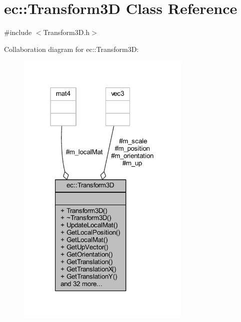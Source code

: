 \hypertarget{classec_1_1_transform3_d}{}\section{ec\+:\+:Transform3D Class Reference}
\label{classec_1_1_transform3_d}


{\ttfamily \#include $<$Transform3\+D.\+h$>$}



Collaboration diagram for ec\+:\+:Transform3D\+:
\nopagebreak
\begin{figure}[H]
\begin{center}
\leavevmode
\includegraphics[width=235pt]{classec_1_1_transform3_d__coll__graph}
\end{center}
\end{figure}
